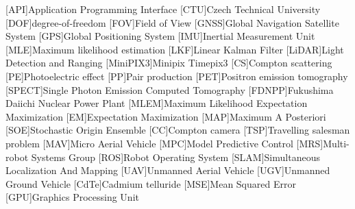 
\begin{acronym}
  [API]{Application Programming Interface}
  [CTU]{Czech Technical University}
  [DOF]{degree-of-freedom}
  [FOV]{Field of View}
  [GNSS]{Global Navigation Satellite System}
  [GPS]{Global Positioning System}
  [IMU]{Inertial Measurement Unit}
  [MLE]{Maximum likelihood estimation}  
  [LKF]{Linear Kalman Filter}
  [LiDAR]{Light Detection and Ranging}
  [MiniPIX3]{Minipix Timepix3}
  [CS]{Compton scattering}
  [PE]{Photoelectric effect}
  [PP]{Pair production}
  [PET]{Positron emission tomography}
  [SPECT]{Single Photon Emission Computed Tomography}
  [FDNPP]{Fukushima Daiichi Nuclear Power Plant}
  [MLEM]{Maximum Likelihood Expectation Maximization}
  [EM]{Expectation Maximization}
  [MAP]{Maximum A Posteriori}
  [SOE]{Stochastic Origin Ensemble}
  [CC]{Compton camera}
  [TSP]{Travelling salesman problem}
  [MAV]{Micro Aerial Vehicle}
  [MPC]{Model Predictive Control}
  [MRS]{Multi-robot Systems Group}
  [ROS]{Robot Operating System}
  [SLAM]{Simultaneous Localization And Mapping}
  [UAV]{Unmanned Aerial Vehicle}
  [UGV]{Unmanned Ground Vehicle}
  [CdTe]{Cadmium telluride}
  [MSE]{Mean Squared Error}
  [GPU]{Graphics Processing Unit}
\end{acronym}
